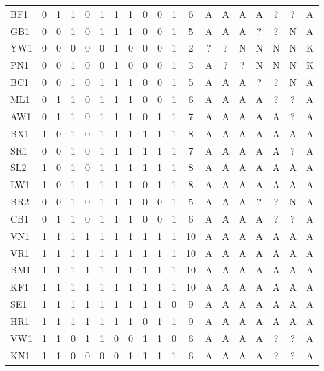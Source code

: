 {\begin{longtable}{@{}lcccccccccccccccccc@{}}
BF1 & 0 & 1 & 1 & 0 & 1 & 1 & 1 & 0 & 0 & 1 & 6 & A & A & A & A & ? & ? & A \\
GB1 & 0 & 0 & 1 & 0 & 1 & 1 & 1 & 0 & 0 & 1 & 5 & A & A & A & ? & ? & N & A \\
YW1 & 0 & 0 & 0 & 0 & 0 & 1 & 0 & 0 & 0 & 1 & 2 & ? & ? & N & N & N & N & K \\
PN1 & 0 & 0 & 1 & 0 & 0 & 1 & 0 & 0 & 0 & 1 & 3 & A & ? & ? & N & N & N & K \\
BC1 & 0 & 0 & 1 & 0 & 1 & 1 & 1 & 0 & 0 & 1 & 5 & A & A & A & ? & ? & N & A \\
ML1 & 0 & 1 & 1 & 0 & 1 & 1 & 1 & 0 & 0 & 1 & 6 & A & A & A & A & ? & ? & A \\
AW1 & 0 & 1 & 1 & 0 & 1 & 1 & 1 & 0 & 1 & 1 & 7 & A & A & A & A & A & ? & A \\
BX1 & 1 & 0 & 1 & 0 & 1 & 1 & 1 & 1 & 1 & 1 & 8 & A & A & A & A & A & A & A \\
SR1 & 0 & 0 & 1 & 0 & 1 & 1 & 1 & 1 & 1 & 1 & 7 & A & A & A & A & A & ? & A \\
SL2 & 1 & 0 & 1 & 0 & 1 & 1 & 1 & 1 & 1 & 1 & 8 & A & A & A & A & A & A & A \\
LW1 & 1 & 0 & 1 & 1 & 1 & 1 & 1 & 0 & 1 & 1 & 8 & A & A & A & A & A & A & A \\
BR2 & 0 & 0 & 1 & 0 & 1 & 1 & 1 & 0 & 0 & 1 & 5 & A & A & A & ? & ? & N & A \\
CB1 & 0 & 1 & 1 & 0 & 1 & 1 & 1 & 0 & 0 & 1 & 6 & A & A & A & A & ? & ? & A \\
VN1 & 1 & 1 & 1 & 1 & 1 & 1 & 1 & 1 & 1 & 1 & 10 & A & A & A & A & A & A & A \\
VR1 & 1 & 1 & 1 & 1 & 1 & 1 & 1 & 1 & 1 & 1 & 10 & A & A & A & A & A & A & A \\
BM1 & 1 & 1 & 1 & 1 & 1 & 1 & 1 & 1 & 1 & 1 & 10 & A & A & A & A & A & A & A \\
KF1 & 1 & 1 & 1 & 1 & 1 & 1 & 1 & 1 & 1 & 1 & 10 & A & A & A & A & A & A & A \\
SE1 & 1 & 1 & 1 & 1 & 1 & 1 & 1 & 1 & 1 & 0 & 9 & A & A & A & A & A & A & A \\
HR1 & 1 & 1 & 1 & 1 & 1 & 1 & 1 & 0 & 1 & 1 & 9 & A & A & A & A & A & A & A \\
VW1 & 1 & 1 & 0 & 1 & 1 & 0 & 0 & 1 & 1 & 0 & 6 & A & A & A & A & ? & ? & A \\
KN1 & 1 & 1 & 0 & 0 & 0 & 0 & 1 & 1 & 1 & 1 & 6 & A & A & A & A & ? & ? & A \\
\end{longtable}}
